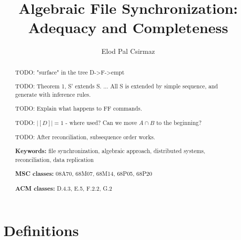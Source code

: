 \documentclass[12pt]{article}
\title{Algebraic File Synchronization: Adequacy and Completeness}
\author{Elod Pal Csirmaz\\
\texttt{\rot{\rot{maz.}{csir}{ep}com}{@}{elod}}}
\date{}
\begin{document}
\maketitle
\begin{abstract}

TODO: "surface" in the tree D->F->empt

TODO: Theorem 1, S' extends S. ... All S is extended by simple sequence, and generate with inference rules.

TODO: Explain what happens to FF commands.

TODO: $|[D]|=1$ - where used? Can we move $A \cap B$ to the beginning?


TODO: After reconciliation, subsequence order works.



\myskip
{\bf Keywords:} %
file synchronization,
algebraic approach,
distributed systems,
reconciliation,
data replication

\myskip
{\bf MSC classes:} %
08A70, %
68M07, %
68M14, %
68P05, %
68P20 %

\myskip
{\bf ACM classes:} %
D.4.3, %
E.5, %
F.2.2, %
G.2 %

\end{abstract}



\section{Definitions}




\end{document}
